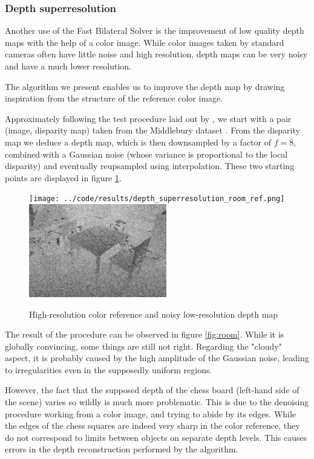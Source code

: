\documentclass{article}
\begin{document}
\subsubsection{Depth superresolution}

Another use of the Fast Bilateral Solver is the improvement of low quality depth maps with the help of a color image. While color images taken by standard cameras often have little noise and high resolution, depth maps can be very noisy and have a much lower resolution.

The algorithm we present enables us to improve the depth map by drawing inspiration from the structure of the reference color image.

\medskip

Approximately following the test procedure laid out by \cite{ferstl_image_2013}, we start with a pair (image, disparity map) taken from the Middlebury dataset \cite{jiang_high-resolution_2014}. From the disparity map we deduce a depth map, which is then downsampled by a factor of $f=8$, combined with a Gaussian noise (whose variance is proportional to the local disparity) and eventually reupsampled using interpolation. These two starting points are displayed in figure \ref{fig:room_original}.

\begin{figure}
    \centering
    \texttt{[image: ../code/results/depth\_superresolution\_room\_ref.png]}
    \includegraphics[width=6cm]{../code/results/depth_superresolution_room_target.png}
    \caption{High-resolution color reference and noisy low-resolution depth map}
    \label{fig:room_original}
\end{figure}

\medskip

The result of the procedure can be observed in figure \ref{fig:room}. While it is globally convincing, some things are still not right. Regarding the "cloudy" aspect, it is probably caused by the high amplitude of the Gaussian noise, leading to irregularities even in the supposedly uniform regions.

However, the fact that the supposed depth of the chess board (left-hand side of the scene) varies so wildly is much more problematic. This is due to the denoising procedure working from a color image, and trying to abide by its edges. While the edges of the chess squares are indeed very sharp in the color reference, they do not correspond to limits between objects on separate depth levels. This causes errors in the depth reconstruction performed by the algorithm.
\end{document}
